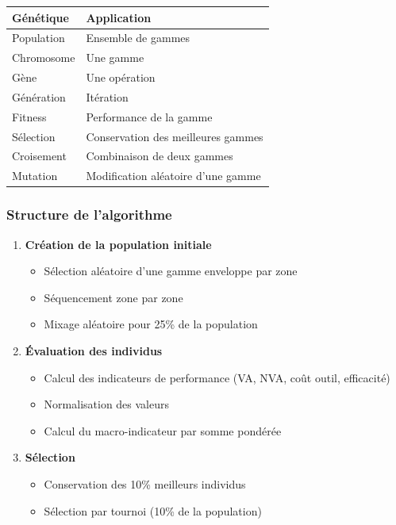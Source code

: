\documentclass{article}
\begin{document}
\begin{table}[h]
\begin{tcolorbox}[colback=blueclair, colframe=blue!70!black, title=Analogies de l'algorithme génétique]
\begin{tabular}{|l|l|}
\hline
\textbf{Génétique} & \textbf{Application} \\
\hline
Population & Ensemble de gammes \\
Chromosome & Une gamme \\
Gène & Une opération \\
Génération & Itération \\
Fitness & Performance de la gamme \\
Sélection & Conservation des meilleures gammes \\
Croisement & Combinaison de deux gammes \\
Mutation & Modification aléatoire d'une gamme \\
\hline
\end{tabular}
\end{tcolorbox}

\subsubsection{Structure de l'algorithme}

\begin{enumerate}
    \item \textbf{Création de la population initiale}
    \begin{itemize}
        \item Sélection aléatoire d'une gamme enveloppe par zone
        \item Séquencement zone par zone
        \item Mixage aléatoire pour 25\% de la population
    \end{itemize}
    
    \item \textbf{Évaluation des individus}
    \begin{itemize}
        \item Calcul des indicateurs de performance (VA, NVA, coût outil, efficacité)
        \item Normalisation des valeurs
        \item Calcul du macro-indicateur par somme pondérée
    \end{itemize}
    
    \item \textbf{Sélection}
    \begin{itemize}
        \item Conservation des 10\% meilleurs individus
        \item Sélection par tournoi (10\% de la population)
    \end{itemize}
    

\end{enumerate}
\end{table}
\end{document}
